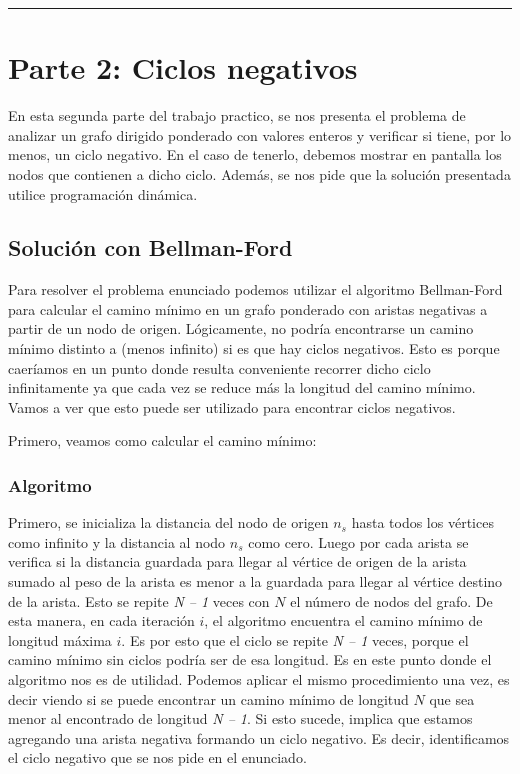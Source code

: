 \documentclass[titlepage,a4paper]{article}
\begin{document}
\noindent\rule{\textwidth}{0.5pt}

\newpage

\section{Parte 2: Ciclos negativos}
\label{sec:orgfe8f543}

En esta segunda parte del trabajo practico, se nos presenta el problema de
analizar un grafo dirigido ponderado con valores enteros y verificar si tiene,
por lo menos, un ciclo negativo. En el caso de tenerlo, debemos mostrar en
pantalla los nodos que contienen a dicho ciclo. Además, se nos pide que la
solución presentada utilice programación dinámica.

\subsection{Solución con Bellman-Ford}
\label{sec:org9a9304f}
Para resolver el problema enunciado podemos utilizar el algoritmo Bellman-Ford
para calcular el camino mínimo en un grafo ponderado con aristas negativas a
partir de un nodo de origen. Lógicamente, no podría encontrarse un camino mínimo
distinto a (menos infinito) si es que hay ciclos negativos. Esto es porque
caeríamos en un punto donde resulta conveniente recorrer dicho ciclo
infinitamente ya que cada vez se reduce más la longitud del camino mínimo. Vamos
a ver que esto puede ser utilizado para encontrar ciclos negativos.


\hfill

Primero, veamos como calcular el camino mínimo:

\subsubsection{Algoritmo}
\label{sec:org7eb290d}

Primero, se inicializa la distancia del nodo de origen \(n_s\) hasta todos los
vértices como infinito y la distancia al nodo \(n_s\) como cero. Luego por cada
arista se verifica si la distancia guardada para llegar al vértice de origen de
la arista sumado al peso de la arista es menor a la guardada para llegar al
vértice destino de la arista. Esto se repite \emph{N – 1} veces con \(N\) el número de
nodos del grafo. De esta manera, en cada iteración \(i\), el algoritmo encuentra el
camino mínimo de longitud máxima \(i\). Es por esto que el ciclo se repite \emph{N – 1}
veces, porque el camino mínimo sin ciclos podría ser de esa longitud. Es en este
punto donde el algoritmo nos es de utilidad. Podemos aplicar el mismo
procedimiento una vez, es decir viendo si se puede encontrar un camino mínimo de
longitud \(N\) que sea menor al encontrado de longitud \emph{N – 1}. Si esto sucede,
implica que estamos agregando una arista negativa formando un ciclo negativo. Es
decir, identificamos el ciclo negativo que se nos pide en el enunciado.
\end{document}
